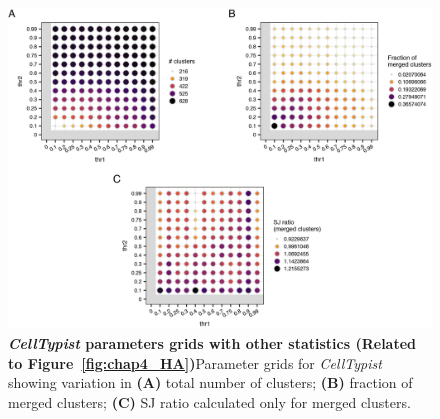 \begin{figure}[ht!] 
\centering    
\includegraphics[width=1.0\textwidth]{Appendix2/Figs/chap4_grids.png} %
\caption[\textit{CellTypist} parameters grids with other statistics]{\textbf{\textit{CellTypist} parameters grids with other statistics (Related to Figure~\ref{fig:chap4_HA})}\newline Parameter grids for \textit{CellTypist} showing variation in \textbf{(A)} total number of clusters; \textbf{(B)} fraction of merged clusters; \textbf{(C)} SJ ratio calculated only for merged clusters.}
\label{fig:appB_grids}
\end{figure}


